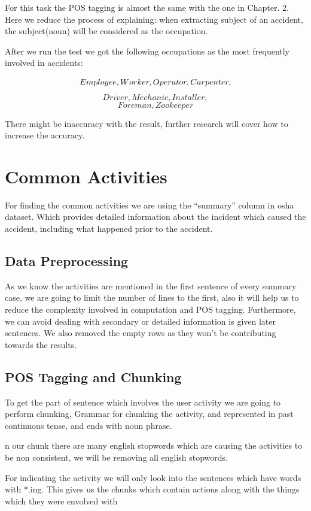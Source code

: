 \documentclass[DIV=calc, paper=a4, fontsize=11pt, twocolumn]{scrartcl}	 %
\begin{document}
For this task the POS tagging is almost the same with the one in
Chapter. 2. Here we reduce the process of explaining: when extracting
subject of an accident, the subject(noun) will be considered as the
occupation.

After we run the test we got the following occupations as the most
frequently involved in accidents:

{\bf $$\small Employee, Worker, Operator, Carpenter,$$
$$Driver, Mechanic, Installer,$$
$$Foreman, Zookeeper$$}

There might be inaccuracy with the result, further research will cover
how to increase the accuracy.


\section{Common Activities}

For finding the common activities we are using the “summary” column in
osha dataset. Which provides detailed information about the incident
which caused the accident, including what happened prior to the
accident.


\subsection{Data Preprocessing}

As we know the activities are mentioned in the first sentence of every summary case, we are going to limit the number of lines to the first, also it will help us to reduce the complexity involved in computation and POS tagging. Furthermore, we can avoid dealing with secondary or detailed information is given later sentences.
We also removed the empty rows as they won’t be contributing towards
the results.




\subsection{POS Tagging and Chunking}

To get the part of sentence which involves the user activity we are
going to perform chunking, Grammar for chunking the activity, and
represented in past continuous tense, and ends with noun phrase.

n our chunk there are many english stopwords which are causing the activities to be non consistent, we will be removing all english stopwords.


For indicating the activity we will only look into the sentences which have words with *.ing. This
gives us the chunks which contain actions along with the things which they were envolved with
\end{document}

